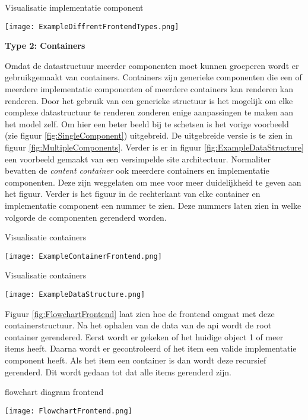 \begin{graphic}
    \captionsetup{type=figure}
    \caption{Visualisatie implementatie component}
    \texttt{[image: ExampleDiffrentFrontendTypes.png]}
    \label{fig:SingleComponent}
\end{graphic}

\whitespace[2]
\textbf{Type 2: Containers}

\whitespace
Omdat de datastructuur meerder componenten moet kunnen groeperen wordt er gebruikgemaakt van containers.
Containers zijn generieke componenten die een of meerdere implementatie componenten of meerdere containers kan renderen kan renderen.
Door het gebruik van een generieke structuur is het mogelijk om elke complexe datastructuur te renderen zonderen enige aanpassingen te maken aan het model zelf.
Om hier een beter beeld bij te schetsen is het vorige voorbeeld (zie figuur \ref{fig:SingleComponent}) uitgebreid.
De uitgebreide versie is te zien in figuur \ref{fig:MultipleComponents}.
Verder is er in figuur \ref{fig:ExampleDataStructure} een voorbeeld gemaakt van een versimpelde site architectuur.
Normaliter bevatten de \textit{content container} ook meerdere containers en implementatie componenten.
Deze zijn weggelaten om mee voor meer duidelijkheid te geven aan het figuur.
Verder is het figuur in de rechterkant van elke container en implementatie component een nummer te zien.
Deze nummers laten zien in welke volgorde de componenten gerenderd worden.

\whitespace
\begin{graphic}
    \captionsetup{type=figure}
    \caption{Visualisatie containers}
    \texttt{[image: ExampleContainerFrontend.png]}
    \label{fig:MultipleComponents}
\end{graphic}

\newpage
\whitespace
\begin{graphic}
    \captionsetup{type=figure}
    \caption{Visualisatie containers}
    \texttt{[image: ExampleDataStructure.png]}
    \label{fig:ExampleDataStructure}
\end{graphic}

\whitespace
Figuur \ref{fig:FlowchartFrontend} laat zien hoe de frontend omgaat met deze containerstructuur.
Na het ophalen van de data van de api wordt de root container gerendered.
Eerst wordt er gekeken of het huidige object 1 of meer items heeft.
Daarna wordt er gecontroleerd of het item een valide implementatie component heeft.
Als het item een container is dan wordt deze recursief gerenderd.
Dit wordt gedaan tot dat alle items gerenderd zijn.

\whitespace
\begin{graphic}
    \captionsetup{type=figure}
    \caption{flowchart diagram frontend}
    \texttt{[image: FlowchartFrontend.png]}
    \label{fig:FlowchartFrontend}
\end{graphic}
